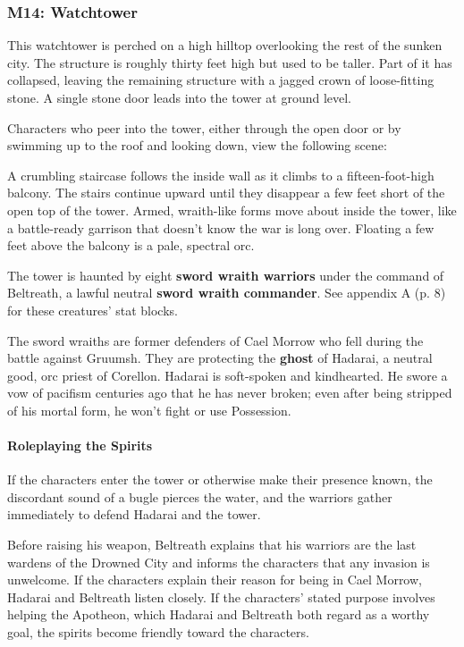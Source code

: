 \documentclass[a4paper, 11pt, bg=full, twocolumn, nooutline]{dndbook}
\begin{document}
\subsubsection{M14: Watchtower}

\begin{DndReadAloud}
This watchtower is perched on a high hilltop overlooking the rest of the sunken city. The structure is roughly thirty feet high but used to be taller. Part of it has collapsed, leaving the remaining structure with a jagged crown of loose-fitting stone. A single stone door leads into the tower at ground level.
\end{DndReadAloud}

Characters who peer into the tower, either through the open door or by swimming up to the roof and looking down, view the following scene:

\begin{DndReadAloud}
A crumbling staircase follows the inside wall as it climbs to a fifteen-foot-high balcony. The stairs continue upward until they disappear a few feet short of the open top of the tower. Armed, wraith-like forms move about inside the tower, like a battle-ready garrison that doesn't know the war is long over. Floating a few feet above the balcony is a pale, spectral orc.
\end{DndReadAloud}

The tower is haunted by eight \textbf{sword wraith warriors} under the command of Beltreath, a lawful neutral \textbf{sword wraith commander}. See appendix A (p. 8) for these creatures' stat blocks.

The sword wraiths are former defenders of Cael Morrow who fell during the battle against Gruumsh. They are protecting the \textbf{ghost} of Hadarai, a neutral good, orc priest of Corellon. Hadarai is soft-spoken and kindhearted. He swore a vow of pacifism centuries ago that he has never broken; even after being stripped of his mortal form, he won't fight or use Possession.

\paragraph{Roleplaying the Spirits}

If the characters enter the tower or otherwise make their presence known, the discordant sound of a bugle pierces the water, and the warriors gather immediately to defend Hadarai and the tower.

Before raising his weapon, Beltreath explains that his warriors are the last wardens of the Drowned City and informs the characters that any invasion is unwelcome. If the characters explain their reason for being in Cael Morrow, Hadarai and Beltreath listen closely. If the characters' stated purpose involves helping the Apotheon, which Hadarai and Beltreath both regard as a worthy goal, the spirits become friendly toward the characters.
\end{document}

